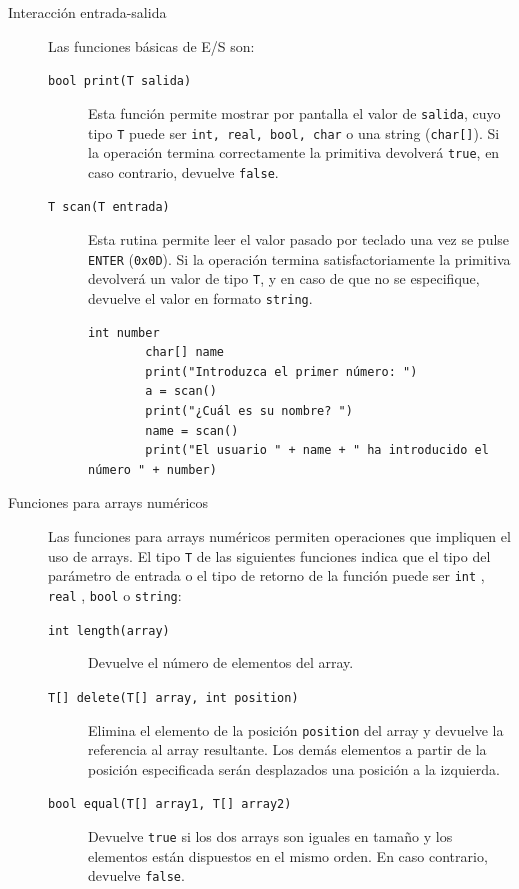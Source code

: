\documentclass[11pt, english]{article}
\begin{document}
\begin{description}
	\item [Interacción entrada-salida] Las funciones básicas de E/S son:
	\begin{description}

		\item[\texttt{bool print(T salida)}] Esta función permite mostrar por pantalla el valor de \texttt{salida}, cuyo tipo \texttt{T} puede ser \texttt{int, real, bool, char} o una string (\texttt{char[]}). Si la operación termina correctamente la primitiva devolverá \texttt{true}, en caso contrario, devuelve \texttt{false}.
		\item[\texttt{T scan(T entrada)}] Esta rutina permite leer el valor pasado por teclado una vez se pulse \texttt{ENTER} (\texttt{0x0D}). Si la operación termina satisfactoriamente la primitiva devolverá un valor de tipo  \texttt{T}, y en caso de que no se especifique, devuelve el valor en formato \texttt{string}.

		\begin{lstlisting}[caption=Ejemplo de uso de la función \texttt{print()} y \texttt{scan()}]
		int number
		char[] name
		print("Introduzca el primer número: ")
		a = scan()
		print("¿Cuál es su nombre? ")
		name = scan()
		print("El usuario " + name + " ha introducido el número " + number)
		\end{lstlisting}
	\end{description}


	\item [Funciones para arrays numéricos] Las funciones para arrays numéricos permiten operaciones que impliquen el uso de arrays. El tipo \texttt{T} de las siguientes funciones indica que el tipo del parámetro de entrada o el tipo de retorno de la función puede ser \texttt{int} ,  \texttt{real} ,  \texttt{bool} o \texttt{string}:

	\begin{description}
		\item [\texttt{int length(array)}] Devuelve el número de elementos del array.
		\item [\texttt{T[] delete(T[] array, int position)}] Elimina el elemento de la posición \texttt{position} del array y devuelve la referencia al array resultante. Los demás elementos a partir de la posición especificada serán desplazados una posición a la izquierda.
		\item [\texttt{bool equal(T[] array1, T[] array2)}] Devuelve \texttt{true} si los dos arrays son iguales en tamaño y los elementos están dispuestos en el mismo orden. En caso contrario, devuelve \texttt{false}.
	\end{description}
\end{description}
\end{document}
